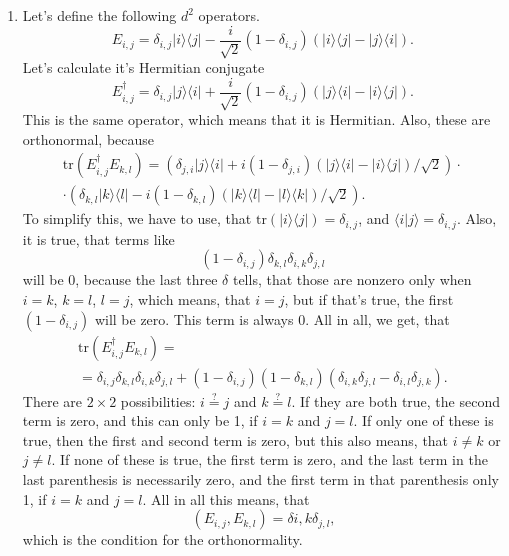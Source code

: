 \documentclass[a4paper,12pt]{article}
\newcommand{\la}{\langle}
\newcommand{\ra}{\rangle}
\begin{document}
\begin{enumerate}[label=(\roman*)]
        \item Let's define the following $d^2$ operators.
            \begin{equation}
                E_{i, j} = \delta_{i, j} | i \ra \la j | - \frac{i}{\sqrt{2}} (1 - \delta_{i, j}) ( | i \ra \la j | - | j \ra \la i | ) \textrm{.}
            \end{equation}
            Let's calculate it's Hermitian conjugate
            \begin{equation}
                E_{i, j}^\dagger = \delta_{i, j} | j \ra \la i | + \frac{i}{\sqrt{2}} (1 - \delta_{i, j}) ( | j \ra \la i | - | i \ra \la j | ) \textrm{.}
            \end{equation}
            This is the same operator, which means that it is Hermitian. Also, these are orthonormal, because
            \begin{gather}
                \nonumber
                \textrm{tr}(E_{i, j}^\dagger E_{k, l}) =
                \left( \delta_{j, i} | j \ra \la i | + i (1 - \delta_{j, i})( | j \ra \la i | - | i \ra \la j |)/\sqrt{2} \right) \cdot\\
                \cdot \left( \delta_{k, l} | k \ra \la l | - i (1 - \delta_{k, l})( | k \ra \la l | - | l \ra \la k |)/\sqrt{2} \right) \textrm{.}
            \end{gather}
            To simplify this, we have to use, that $\textrm{tr}(|i\ra \la j |) = \delta_{i, j}$, and $\la i | j \ra = \delta_{i, j}$. Also, it is true, that terms like
            \begin{equation}
                (1 - \delta_{i, j})\delta_{k, l}\delta_{i, k}\delta_{j, l}
            \end{equation}
            will be 0, because the last three $\delta$ tells, that those are nonzero only when $i = k$, $k = l$, $l = j$, which means, that $i = j$, but if that's true, the first $(1 - \delta_{i, j})$ will be zero. This term is always 0.
            All in all, we get, that
            \begin{gather}
                \nonumber
                \textrm{tr}(E_{i, j}^\dagger E_{k, l}) =\\
                = \delta_{i, j}\delta_{k, l}\delta_{i, k}\delta_{j, l} + (1-\delta_{i, j})(1-\delta_{k, l})(\delta_{i, k}\delta_{j, l}-\delta_{i, l}\delta_{j, k}) \textrm{.}
            \end{gather}
            There are $2\times 2$ possibilities: $i \overset{?}= j$ and $k \overset{?}{=} l$. If they are both true, the second term is zero, and this can only be 1, if $i = k$ and $j = l$. If only one of these is true, then the first and second term is zero, but this also means, that $i \neq k$ or $j \neq l$. If none of these is true, the first term is zero, and the last term in the last parenthesis is necessarily zero, and the first term in that parenthesis only 1, if $i = k$ and $j = l$. All in all this means, that
            \begin{equation}
                (E_{i, j}, E_{k, l}) = \delta{i, k} \delta_{j, l} \textrm{,}
            \end{equation}
            which is the condition for the orthonormality.


\end{enumerate}
\end{document}

